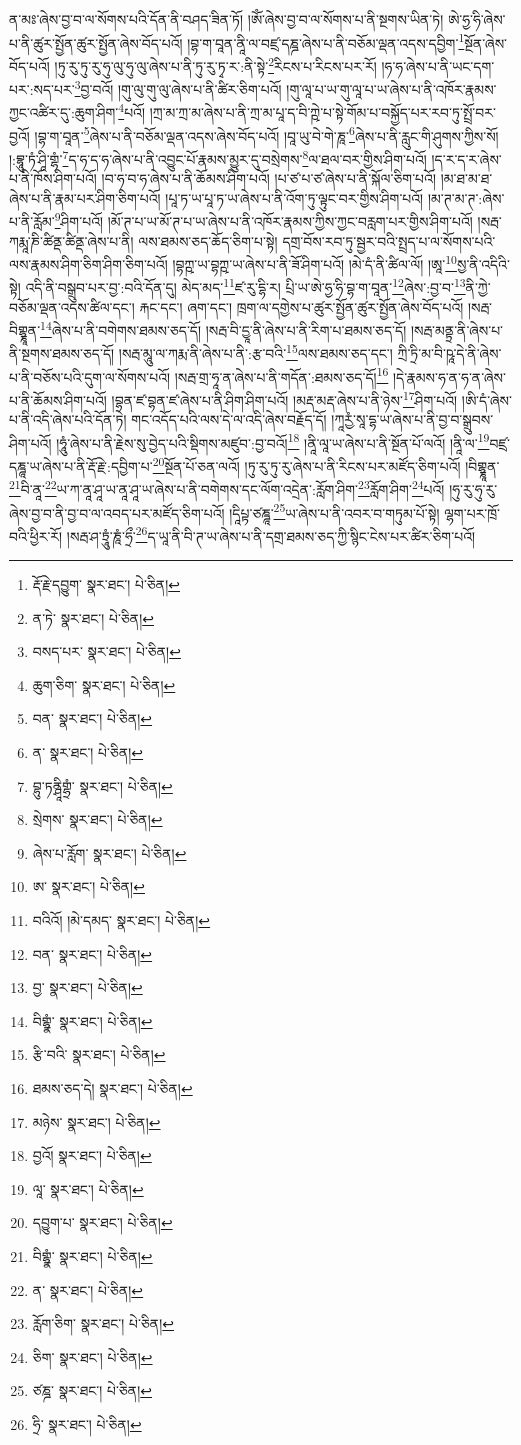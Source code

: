 ན་མཿ་ཞེས་བྱ་བ་ལ་སོགས་པའི་དོན་ནི་བཤད་ཟིན་ཏོ། །ཨོཾ་ཞེས་བྱ་བ་ལ་སོགས་པ་ནི་སྔགས་ཡིན་ཏེ། ཨེ་ཧྱ་ཧི་ཞེས་པ་ནི་ཚུར་སྤྱོན་ཚུར་སྤྱོན་ཞེས་བོད་པའོ། །བྷ་ག་བཱན་ནཱི་ལ་བཛྲ་དཎྜ་ཞེས་པ་ནི་བཅོམ་ལྡན་འདས་དབྱིག་\footnote{རྡོ་རྗེ་དབྱུག་  སྣར་ཐང་།  པེ་ཅིན། }སྔོན་ཞེས་བོད་པའོ། །ཏུ་རུ་ཏུ་རུ་ཧུ་ལུ་ཧུ་ལུ་ཞེས་པ་ནི་ཏུ་རུ་ཏྭ་ར་:ནི་སྟེ་\footnote{ན་ཏེ་  སྣར་ཐང་།  པེ་ཅིན། }རིངས་པ་རིངས་པར་རོ། །ཧ་ཧ་ཞེས་པ་ནི་ཡང་དག་པར་:སད་པར་\footnote{བསད་པར་  སྣར་ཐང་།  པེ་ཅིན། }བྱ་བའོ། །གུ་ལུ་གུ་ལུ་ཞེས་པ་ནི་ཚིར་ཅིག་པའོ། །གུ་ལཱ་པ་ཡ་གུ་ལཱ་པ་ཡ་ཞེས་པ་ནི་འཁོར་རྣམས་ཀྱང་འཚིར་དུ་:ཆུག་ཤིག་\footnote{ཆུག་ཅིག་  སྣར་ཐང་།  པེ་ཅིན། }པའོ། །ཀྲ་མ་ཀྲ་མ་ཞེས་པ་ནི་ཀྲ་མ་པཱ་ད་བི་ཀྵེ་པ་སྟེ་གོམ་པ་བསྐྱོད་པར་རབ་ཏུ་སྤྲོ་བར་བྱའོ། །བྷ་ག་བཱན་\footnote{བན་  སྣར་ཐང་།  པེ་ཅིན། }ཞེས་པ་ནི་བཅོམ་ལྡན་འདས་ཞེས་བོད་པའོ། །བཱ་ཡུ་བེ་གེ་ཎཱ་\footnote{ན་  སྣར་ཐང་།  པེ་ཅིན། }ཞེས་པ་ནི་རླུང་གི་ཤུགས་ཀྱིས་སོ། །:བྷཱུ་ཏཾ་ཤཱི་གྷཾ་\footnote{བྷུ་ཏནྴཱིགྷྲཾ་  སྣར་ཐང་།  པེ་ཅིན། }ད་ཧ་ད་ཧ་ཞེས་པ་ནི་འབྱུང་པོ་རྣམས་མྱུར་དུ་བསྲེགས་\footnote{སྲེགས་  སྣར་ཐང་།  པེ་ཅིན། }ལ་ཐལ་བར་གྱིས་ཤིག་པའོ། །ད་ར་ད་ར་ཞེས་པ་ནི་ཁོས་ཤིག་པའོ། །བ་ཧ་བ་ཧ་ཞེས་པ་ནི་ཆོམས་ཤིག་པའོ། །པ་ཙ་པ་ཙ་ཞེས་པ་ནི་སྐོལ་ཅིག་པའོ། །མ་ཐ་མ་ཐ་ཞེས་པ་ནི་རྣམ་པར་ཤིག་ཅིག་པའོ། །པཱ་ཏ་ཡ་པཱ་ཏ་ཡ་ཞེས་པ་ནི་འོག་ཏུ་ལྟུང་བར་གྱིས་ཤིག་པའོ། །མ་ཊ་མ་ཊ་:ཞེས་པ་ནི་རློམ་\footnote{ཞེས་པ་རློག་  སྣར་ཐང་།  པེ་ཅིན། }ཤིག་པའོ། །མོ་ཊ་པ་ཡ་མོ་ཊ་པ་ཡ་ཞེས་པ་ནི་འཁོར་རྣམས་ཀྱིས་ཀྱང་བརླག་པར་གྱིས་ཤིག་པའོ། །སརྦ་ཀརྨཱ་ཎི་ཚིནྡ་ཚིནྡ་ཞེས་པ་ནི། ལས་ཐམས་ཅད་ཆོད་ཅིག་པ་སྟེ། དགྲ་བོས་རབ་ཏུ་སྦྱར་བའི་སྤྲད་པ་ལ་སོགས་པའི་ལས་རྣམས་ཤིག་ཅིག་ཤིག་ཅིག་པའོ། །བྷཀྵ་ཡ་བྷཀྵ་ཡ་ཞེས་པ་ནི་ཟོ་ཤིག་པའོ། །མེ་དཾ་ནི་ཚིལ་ལོ། །ཨཱ་\footnote{ཨ་  སྣར་ཐང་།  པེ་ཅིན། }སྱ་ནི་འདིའི་སྟེ། འདི་ནི་བསྒྲུབ་པར་བྱ་:བའི་དོན་དུ། མེད་མད་\footnote{བའིའོ། །མེ་དམད་  སྣར་ཐང་།  པེ་ཅིན། }ཛ་རུ་དྷི་ར། པྲི་ཡ་ཨེ་ཧྱ་ཧི་བྷ་ག་བཱན་\footnote{བན་  སྣར་ཐང་།  པེ་ཅིན། }ཞེས་:བྱ་བ་\footnote{བྱ་  སྣར་ཐང་།  པེ་ཅིན། }ནི་ཀྱེ་བཅོམ་ལྡན་འདས་ཚིལ་དང་། རྐང་དང་། ཞག་དང་། ཁྲག་ལ་དགྱེས་པ་ཚུར་སྤྱོན་ཚུར་སྤྱོན་ཞེས་བོད་པའོ། །སརྦ་བིགྷྣཱན་\footnote{བིགྷྣཾ་  སྣར་ཐང་།  པེ་ཅིན། }ཞེས་པ་ནི་བགེགས་ཐམས་ཅད་དོ། །སརྦ་བི་དྱཱ་ནི་ཞེས་པ་ནི་རིག་པ་ཐམས་ཅད་དོ། །སརྦ་མནྟྲ་ནི་ཞེས་པ་ནི་སྔགས་ཐམས་ཅད་དོ། །སརྦ་མཱུ་ལ་ཀརྨ་ནི་ཞེས་པ་ནི་:རྩ་བའི་\footnote{རྩི་བའི་  སྣར་ཐང་།  པེ་ཅིན། }ལས་ཐམས་ཅད་དང་། ཀྲི་ཏྲི་མ་བི་ཥཱ་དེ་ནི་ཞེས་པ་ནི་བཅོས་པའི་དུག་ལ་སོགས་པའོ། །སརྦ་གྲ་ཧཱ་ན་ཞེས་པ་ནི་གདོན་:ཐམས་ཅད་དོ།\footnote{ཐམས་ཅད་དེ།  སྣར་ཐང་།  པེ་ཅིན། } །དེ་རྣམས་ཧ་ན་ཧ་ན་ཞེས་པ་ནི་ཆོམས་ཤིག་པའོ། །བྷན་ཛ་བྷན་ཛ་ཞེས་པ་ནི་ཤིག་ཤིག་པའོ། །མརྡ་མརྡ་ཞེས་པ་ནི་ཉེས་\footnote{མཉེས་  སྣར་ཐང་།  པེ་ཅིན། }ཤིག་པའོ། །ཨི་དཾ་ཞེས་པ་ནི་འདི་ཞེས་པའི་དོན་ཏེ། གང་འདོད་པའི་ལས་དེ་ལ་འདི་ཞེས་བརྗོད་དོ། །ཀཱརྱཾ་སཱ་དྷ་ཡ་ཞེས་པ་ནི་བྱ་བ་སྒྲུབས་ཤིག་པའོ། །ཧཱུཾ་ཞེས་པ་ནི་རྗེས་སུ་བྱེད་པའི་སྡིགས་མཛུབ་:བྱ་བའོ།\footnote{བྱའོ།  སྣར་ཐང་།  པེ་ཅིན། } །ནཱི་ལཱ་ཡ་ཞེས་པ་ནི་སྔོན་པོ་ལའོ། །ནཱི་ལ་\footnote{ལཱ་  སྣར་ཐང་།  པེ་ཅིན། }བཛྲ་དཎྜཱ་ཡ་ཞེས་པ་ནི་རྡོ་རྗེ་:དབྱིག་པ་\footnote{དབྱུག་པ་  སྣར་ཐང་།  པེ་ཅིན། }སྔོན་པོ་ཅན་ལའོ། །ཏུ་རུ་ཏུ་རུ་ཞེས་པ་ནི་རིངས་པར་མཛོད་ཅིག་པའོ། །བིགྷྣཱན་\footnote{བིགྷྣཾ་  སྣར་ཐང་།  པེ་ཅིན། }བི་ནཱ་\footnote{ན་  སྣར་ཐང་།  པེ་ཅིན། }ཡ་ཀ་ནཱ་ཤཱ་ཡ་ནཱ་ཤཱ་ཡ་ཞེས་པ་ནི་བགེགས་དང་ལོག་འདྲེན་:རློག་ཤིག་\footnote{རློག་ཅིག་  སྣར་ཐང་།  པེ་ཅིན། }རློག་ཤིག་\footnote{ཅིག་  སྣར་ཐང་།  པེ་ཅིན། }པའོ། །ཧུ་རུ་ཧུ་རུ་ཞེས་བྱ་བ་ནི་བྱ་བ་ལ་འབད་པར་མཛོད་ཅིག་པའོ། །དཱིཔྟ་ཙཎྜཱ་\footnote{ཙཎྜ་  སྣར་ཐང་།  པེ་ཅིན། }ཡ་ཞེས་པ་ནི་འབར་བ་གཏུམ་པོ་སྟེ། ལྷག་པར་ཁྲོ་བའི་ཕྱིར་རོ། །སརྦ་ཤ་ཏྲཱུཾ་ཎཱཾ་ཧྲྀ་\footnote{ཧྲི་  སྣར་ཐང་།  པེ་ཅིན། }ད་ཡཱ་ནི་བི་ཊ་ཡ་ཞེས་པ་ནི་དགྲ་ཐམས་ཅད་ཀྱི་སྙིང་ངེས་པར་ཚིར་ཅིག་པའོ། 